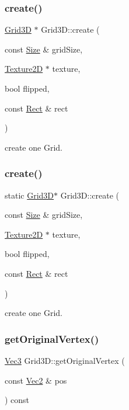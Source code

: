 \subsubsection{\texorpdfstring{create()}{create()}\hspace{0.1cm}{\footnotesize\ttfamily [7/8]}}
{\footnotesize\ttfamily \hyperlink{classGrid3D}{Grid3D} $\ast$ Grid3\+D\+::create (\begin{DoxyParamCaption}\item[{const \hyperlink{classSize}{Size} \&}]{grid\+Size,  }\item[{\hyperlink{classTexture2D}{Texture2D} $\ast$}]{texture,  }\item[{bool}]{flipped,  }\item[{const \hyperlink{classRect}{Rect} \&}]{rect }\end{DoxyParamCaption})\hspace{0.3cm}{\ttfamily [static]}}

create one Grid. \mbox{\label{classGrid3D_a619f4692c902a986dedbe01b75a71df0}} 
\subsubsection{\texorpdfstring{create()}{create()}\hspace{0.1cm}{\footnotesize\ttfamily [8/8]}}
{\footnotesize\ttfamily static \hyperlink{classGrid3D}{Grid3D}$\ast$ Grid3\+D\+::create (\begin{DoxyParamCaption}\item[{const \hyperlink{classSize}{Size} \&}]{grid\+Size,  }\item[{\hyperlink{classTexture2D}{Texture2D} $\ast$}]{texture,  }\item[{bool}]{flipped,  }\item[{const \hyperlink{classRect}{Rect} \&}]{rect }\end{DoxyParamCaption})\hspace{0.3cm}{\ttfamily [static]}}

create one Grid. \mbox{\label{classGrid3D_a02428c7bc60ac15aa12448bb63613647}} 
\subsubsection{\texorpdfstring{get\+Original\+Vertex()}{getOriginalVertex()}\hspace{0.1cm}{\footnotesize\ttfamily [1/2]}}
{\footnotesize\ttfamily \hyperlink{classVec3}{Vec3} Grid3\+D\+::get\+Original\+Vertex (\begin{DoxyParamCaption}\item[{const \hyperlink{classVec2}{Vec2} \&}]{pos }\end{DoxyParamCaption}) const}

